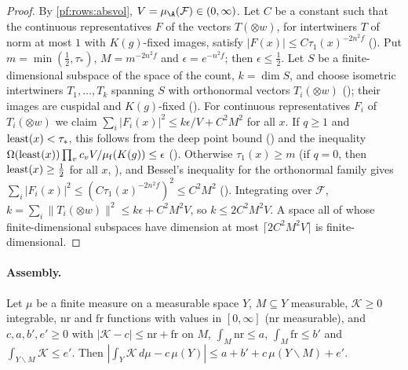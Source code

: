\begin{proof}
By \cref{pf:rows:absvol}, $V=\mu_{\A}(\mathcal F)\in(0,\infty)$. Let $C$ be a constant such that the continuous
representatives $F$ of the vectors $T(\otimes w)$, for intertwiners $T$ of norm at most $1$ with $K(g)$-fixed images, satisfy
$|F(x)|\le C\tau_1(x)^{-2n^2f}$ (). Put
$m=\min(\frac12,\tau_*)$, $M=m^{-2n^2f}$ and $\epsilon=e^{-n^2f}$; then $\epsilon\le\frac12$. Let $S$ be a finite-dimensional
subspace of the space of the count, $k=\dim S$, and choose isometric intertwiners $T_1,\dots,T_k$ spanning $S$ with
orthonormal vectors $T_i(\otimes w)$ (); their images
are cuspidal and $K(g)$-fixed (). For continuous
representatives $F_i$ of $T_i(\otimes w)$ we claim $\sum_i|F_i(x)|^2\le k\epsilon/V+C^2M^2$ for all $x$. If $q\ge1$ and
$\operatorname{least}(x)<\tau_*$, this follows from the deep point bound
() and the inequality
$\Omega(\operatorname{least}(x))\prod_vc_v V/\mu_{\mathrm f}(K(g))\le\epsilon$
(). Otherwise $\tau_1(x)\ge m$ (if $q=0$, then
$\operatorname{least}(x)\ge\frac12$ for all $x$, ), and Bessel's inequality for the
orthonormal family gives $\sum_i|F_i(x)|^2\le(C\tau_1(x)^{-2n^2f})^2\le C^2M^2$
(). Integrating over $\mathcal F$,
$k=\sum_i\|T_i(\otimes w)\|^2\le k\epsilon+C^2M^2V$, so $k\le2C^2M^2V$. A space all of whose finite-dimensional subspaces
have dimension at most $\lceil2C^2M^2V\rceil$ is finite-dimensional.
\end{proof}

\paragraph{Assembly.}

\begin{lemma}\label{pf:rows:split}
Let $\mu$ be a finite measure on a measurable space $Y$, $M\subseteq Y$ measurable, $\mathcal K\ge0$ integrable, $\mathrm{nr}$ and
$\mathrm{fr}$ functions with values in $[0,\infty]$ ($\mathrm{nr}$ measurable), and $c,a,b',e'\ge0$ with
$|\mathcal K-c|\le\mathrm{nr}+\mathrm{fr}$ on $M$, $\int_M\mathrm{nr}\le a$, $\int_M\mathrm{fr}\le b'$ and $\int_{Y\smallsetminus M}\mathcal K\le e'$.
Then $|\int_Y\mathcal K\,d\mu-c\,\mu(Y)|\le a+b'+c\,\mu(Y\smallsetminus M)+e'$.
\end{lemma}

